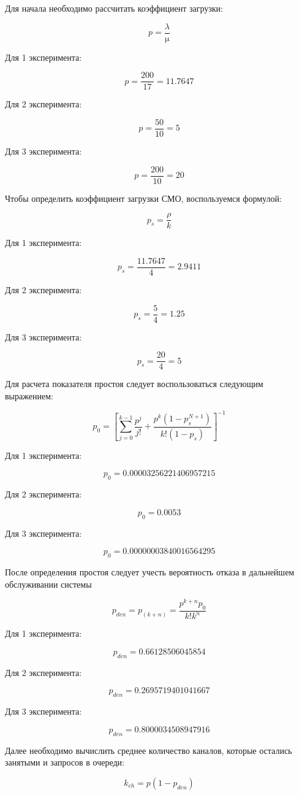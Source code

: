 Для начала необходимо рассчитать коэффициент загрузки:

$$p = \frac{\lambda}{\upmu}$$

Для 1 эксперимента:

$$p = \frac{200}{17} = 11.7647$$

Для 2 эксперимента:

$$p = \frac{50}{10} = 5$$

Для 3 эксперимента:

$$p = \frac{200}{10} = 20$$

Чтобы определить коэффициент загрузки СМО, воспользуемся формулой:

$$p_s = \frac{\rho}{k}$$

Для 1 эксперимента:

$$p_s = \frac{11.7647}{4} = 2.9411$$

Для 2 эксперимента:

$$p_s = \frac{5}{4} = 1.25$$

Для 3 эксперимента:

$$p_s = \frac{20}{4} = 5$$

Для расчета показателя простоя следует воспользоваться следующим
выражением:

$$p_0 = \left[ \sum_{j=0}^{k-1} \frac{p^j}{j!} + \frac{p^k \left(1 - p_s^{N+1}\right)}{k! \left(1 - p_s\right)} \right]^{-1}$$

Для 1 эксперимента:

$$p_0 = 0.00003256221406957215$$

Для 2 эксперимента:

$$p_0 = 0.0053$$

Для 3 эксперимента:

$$p_0 = 0.00000003840016564295$$

После определения простоя следует учесть вероятность отказа в
дальнейшем обслуживании системы

$$p_{den} = p_{(k+n)} = \frac{p^{k+n}p_0}{k!k^n}$$

Для 1 эксперимента:

$$p_{den} = 0.66128506045854$$

Для 2 эксперимента:

$$p_{den} = 0.2695719401041667$$

Для 3 эксперимента:

$$p_{den} = 0.8000034508947916$$

Далее необходимо вычислить среднее количество каналов, которые
остались занятыми и запросов в очереди:

$$k_{ch} = p(1 - p_{den})$$


